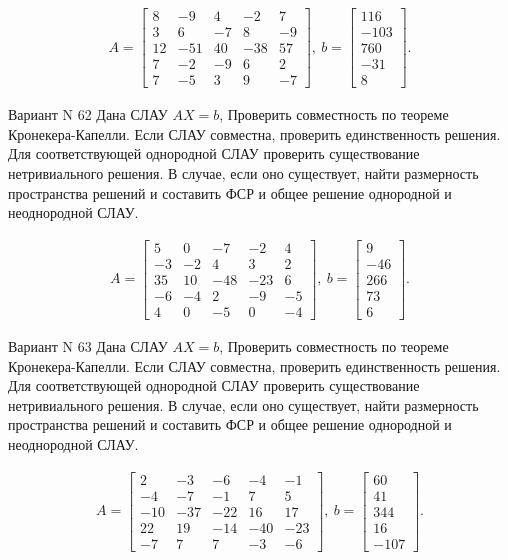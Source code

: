 \documentclass[11pt]{report}
\begin{document}
\begin{align*}
 A = \left[\begin{matrix}8 & -9 & 4 & -2 & 7\\3 & 6 & -7 & 8 & -9\\12 & -51 & 40 & -38 & 57\\7 & -2 & -9 & 6 & 2\\7 & -5 & 3 & 9 & -7\end{matrix}\right],
\ b = \left[\begin{matrix}116\\-103\\760\\-31\\8\end{matrix}\right]. 
 \end{align*}

Вариант N 62
Дана СЛАУ $AX = b$,
Проверить совместность по теореме Кронекера-Капелли. Если СЛАУ совместна, проверить единственность решения.
Для соответствующей однородной СЛАУ проверить существование нетривиального решения. В случае, если оно существует,
найти размерность пространства решений и составить ФСР и общее решение однородной  и неоднородной СЛАУ.


\begin{align*}
 A = \left[\begin{matrix}5 & 0 & -7 & -2 & 4\\-3 & -2 & 4 & 3 & 2\\35 & 10 & -48 & -23 & 6\\-6 & -4 & 2 & -9 & -5\\4 & 0 & -5 & 0 & -4\end{matrix}\right],
\ b = \left[\begin{matrix}9\\-46\\266\\73\\6\end{matrix}\right]. 
 \end{align*}

Вариант N 63
Дана СЛАУ $AX = b$,
Проверить совместность по теореме Кронекера-Капелли. Если СЛАУ совместна, проверить единственность решения.
Для соответствующей однородной СЛАУ проверить существование нетривиального решения. В случае, если оно существует,
найти размерность пространства решений и составить ФСР и общее решение однородной  и неоднородной СЛАУ.


\begin{align*}
 A = \left[\begin{matrix}2 & -3 & -6 & -4 & -1\\-4 & -7 & -1 & 7 & 5\\-10 & -37 & -22 & 16 & 17\\22 & 19 & -14 & -40 & -23\\-7 & 7 & 7 & -3 & -6\end{matrix}\right],
\ b = \left[\begin{matrix}60\\41\\344\\16\\-107\end{matrix}\right]. 
 \end{align*}
\end{document}
